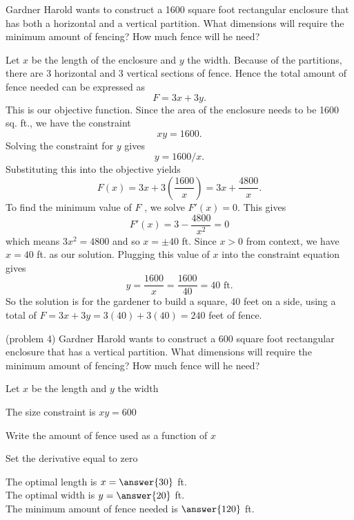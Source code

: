 \documentclass[handout]{ximera}
\begin{document}
\begin{example}[example 4]
Gardner Harold wants to construct a 1600 square foot  rectangular enclosure that has both a 
horizontal and a vertical partition. What dimensions will require the minimum amount of fencing?  
How much fence will he need?

\begin{center}
\end{center}

Let $x$ be the length of the enclosure and $y$ the width. Because of the partitions, there are 3 horizontal and 3 vertical sections of fence. Hence the total amount of fence needed can be expressed as 
\[F = 3x + 3y.\]
 This is our objective function. Since the area of the enclosure needs to be 1600 sq. ft., we have the constraint 
\[xy = 1600.\]
Solving the constraint for $y$ gives 
\[
y = 1600/x.
\]
  Substituting this into the objective yields
\[F(x) = 3x + 3\left(\frac{1600}{x}\right) = 3x + \frac{4800}{x}.\]
To find the minimum value of $F$ , we solve $F'(x) = 0$. This gives
\[F'(x) = 3 - \frac{4800}{x^2} = 0\]
which means $3x^2 = 4800$ and so $x = \pm 40$ ft.  Since $x>0$ from context, we have $x = 40$ ft. as our solution.
Plugging this value of $x$ into the constraint equation gives
\[y = \frac{1600}{x} = \frac{1600}{40} = 40 \mbox{ ft.}\]
So the solution is for the gardener to build a square, 40 feet on a side, using a total of $F = 3x+ 3y = 3(40) + 3(40)
= 240$ feet of fence.
\end{example}

\begin{problem}(problem 4)
Gardner Harold wants to construct a 600 square foot  rectangular enclosure that has a 
vertical partition. What dimensions will require the minimum amount of fencing?  
How much fence will he need?

\begin{hint}
Let $x$ be the length and $y$ the width
\end{hint}
\begin{hint}
The size constraint is $xy = 600$
\end{hint}
\begin{hint}
Write the amount of fence used as a function of $x$
\end{hint}
\begin{hint}
Set the derivative equal to zero
\end{hint}

The optimal length is $x= \answer{30}$ ft.\\
The optimal width is $y = \answer{20}$ ft.\\
The minimum amount of fence needed is $\answer{120}$ ft.
\end{problem}
\end{document}
